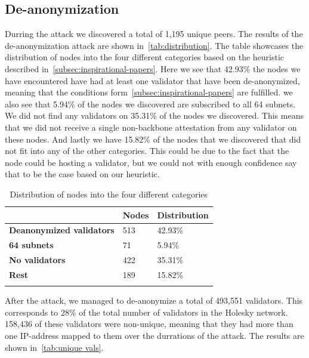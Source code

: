 \subsection{De-anonymization}\label{subsec:de-anonymization}
Durring the attack we discovered a total of 1,195 unique peers.
The results of the de-anonymization attack are shown in~\autoref{tab:distribution}.
The table showcases the distribution of nodes into the four different categories based on the heuristic described in~\autoref{subsec:inspirational-papers}.
Here we see that 42.93\% the nodes we have encountered have had at least one validator that have been de-anonymized, meaning that the conditions form~\autoref{subsec:inspirational-papers} are fulfilled.
we also see that 5.94\% of the nodes we discovered are subscribed to all 64 subnets.
We did not find any validators on 35.31\% of the nodes we discovered.
This means that we did not receive a single non-backbone attestation from any validator on these nodes.
And lastly we have 15.82\% of the nodes that we discovered that did not fit into any of the other categories.
This could be due to the fact that the node could be hosting a validator, but we could not with enough confidence say that to be the case based on our heuristic.


\begin{table}[]
    \centering
    \begin{tabular}{lll}
        \hline
        & \textbf{Nodes} & \textbf{Distribution} \\ \hline
        \textbf{Deanonymized validators} & 513            & 42.93\%                 \\
        \textbf{64 subnets}              & 71             & 5.94\%                  \\
        \textbf{No validators}           & 422              & 35.31\%               \\
        \textbf{Rest}                    & 189            & 15.82\%                 \\ \hline
        \\
    \end{tabular}
    \caption{Distribution of nodes into the four different categories}
    \label{tab:distribution}
\end{table}


After the attack, we managed to de-anonymize a total of 493,551 validators.
This corresponds to 28\% of the total number of validators in the Holesky network.
158,436 of these validators were non-unique, meaning that they had more than one IP-address mapped to them over the durrations of the attack.
The results are shown in~\autoref{tab:unique vals}.


